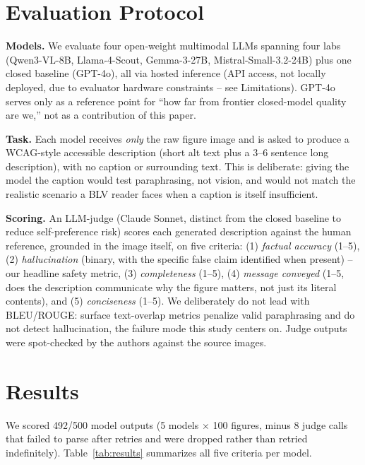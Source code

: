 \documentclass[10pt,conference]{IEEEtran}
\begin{document}
\section{Evaluation Protocol}

\textbf{Models.} We evaluate four open-weight multimodal LLMs spanning four labs (Qwen3-VL-8B, Llama-4-Scout, Gemma-3-27B, Mistral-Small-3.2-24B) plus one closed baseline (GPT-4o), all via hosted inference (API access, not locally deployed, due to evaluator hardware constraints -- see Limitations). GPT-4o serves only as a reference point for ``how far from frontier closed-model quality are we,'' not as a contribution of this paper.

\textbf{Task.} Each model receives \emph{only} the raw figure image and is asked to produce a WCAG-style accessible description (short alt text plus a 3--6 sentence long description), with no caption or surrounding text. This is deliberate: giving the model the caption would test paraphrasing, not vision, and would not match the realistic scenario a BLV reader faces when a caption is itself insufficient.

\textbf{Scoring.} An LLM-judge (Claude Sonnet, distinct from the closed baseline to reduce self-preference risk) scores each generated description against the human reference, grounded in the image itself, on five criteria: (1) \emph{factual accuracy} (1--5), (2) \emph{hallucination} (binary, with the specific false claim identified when present) -- our headline safety metric, (3) \emph{completeness} (1--5), (4) \emph{message conveyed} (1--5, does the description communicate why the figure matters, not just its literal contents), and (5) \emph{conciseness} (1--5). We deliberately do not lead with BLEU/ROUGE: surface text-overlap metrics penalize valid paraphrasing and do not detect hallucination, the failure mode this study centers on. Judge outputs were spot-checked by the authors against the source images.

\section{Results}
\label{sec:results}

We scored 492/500 model outputs (5 models $\times$ 100 figures, minus 8 judge calls that failed to parse after retries and were dropped rather than retried indefinitely). Table~\ref{tab:results} summarizes all five criteria per model.
\end{document}
